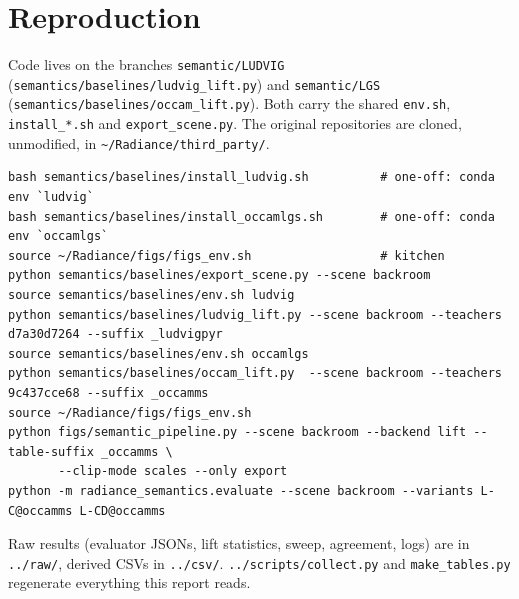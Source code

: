 \documentclass[11pt,a4paper]{article}
\newcommand{\code}[1]{\texttt{\small #1}}
\begin{document}
\section{Reproduction}
Code lives on the branches \code{semantic/LUDVIG} (\code{semantics/baselines/ludvig\_lift.py}) and \code{semantic/LGS}
(\code{semantics/baselines/occam\_lift.py}). Both carry the shared \code{env.sh}, \code{install\_*.sh} and
\code{export\_scene.py}. The original repositories are cloned, unmodified, in \code{\textasciitilde/Radiance/third\_party/}.
{\footnotesize
\begin{verbatim}
bash semantics/baselines/install_ludvig.sh          # one-off: conda env `ludvig`
bash semantics/baselines/install_occamlgs.sh        # one-off: conda env `occamlgs`
source ~/Radiance/figs/figs_env.sh                  # kitchen
python semantics/baselines/export_scene.py --scene backroom
source semantics/baselines/env.sh ludvig
python semantics/baselines/ludvig_lift.py --scene backroom --teachers d7a30d7264 --suffix _ludvigpyr
source semantics/baselines/env.sh occamlgs
python semantics/baselines/occam_lift.py  --scene backroom --teachers 9c437cce68 --suffix _occamms
source ~/Radiance/figs/figs_env.sh
python figs/semantic_pipeline.py --scene backroom --backend lift --table-suffix _occamms \
       --clip-mode scales --only export
python -m radiance_semantics.evaluate --scene backroom --variants L-C@occamms L-CD@occamms
\end{verbatim}
}
Raw results (evaluator JSONs, lift statistics, sweep, agreement, logs) are in \code{../raw/}, derived CSVs in
\code{../csv/}. \code{../scripts/collect.py} and \code{make\_tables.py} regenerate everything this report reads.
\end{document}
